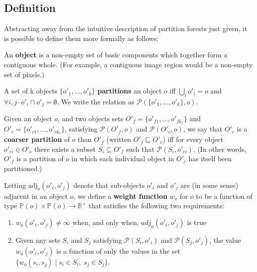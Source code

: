 \subsection{Definition}
\label{sec:ipfs-definition}

Abstracting away from the intuitive description of partition forests just given, it is possible to define them more formally as follows:

\begin{definition}
An \textbf{object} is a non-empty set of basic components which together form a contiguous whole. (For example, a contiguous image region would be a non-empty set of pixels.)
\end{definition}

\begin{definition}
A set of k objects $\{o'_1,\ldots,o'_k\}$ \textbf{partitions} an object $o$ iff $\bigcup_i o'_i = o$ and $\forall i,j \cdot o'_i \cap o'_j = \emptyset$. We write the relation as $\mathcal{P}(\{o'_1,\ldots,o'_k\}, o)$.
\end{definition}

\begin{definition}
Given an object $o$, and two objects sets $O'_f = \{o'_{f1},\ldots,o'_{fk_f}\}$ and $O'_c = \{o'_{c1},\ldots,o'_{ck_c}\}$, satisfying $\mathcal{P}(O'_f,o)$ and $\mathcal{P}(O'_c,o)$, we say that $O'_c$ is a \textbf{coarser partition} of $o$ than $O'_f$ (written $O'_f \sqsubseteq O'_c$) iff for every object $o'_{ci} \in O'_c$ there exists a subset $S_i \subseteq O'_f$ such that $\mathcal{P}(S_i,o'_{ci})$. (In other words, $O'_f$ is a partition of $o$ in which each individual object in $O'_c$ has itself been partitioned.)
\end{definition}

\begin{definition}
Letting $\mbox{adj}_o(o'_i, o'_j)$ denote that sub-objects $o'_i$ and $o'_j$ are (in some sense) adjacent in an object $o$, we define a \textbf{weight function} $w_o$ for $o$ to be a function of type $\mathbb{P}(o) \times \mathbb{P}(o) \to \mathbb{R}^+$ that satisfies the following two requirements:
%
\begin{enumerate}

\item $w_o(o'_i, o'_j) \ne \infty$ when, and only when, $adj_o(o'_i, o'_j)$ is true

\item Given any sets $S_i$ and $S_j$ satisfying $\mathcal{P}(S_i,o'_i)$ and $\mathcal{P}(S_j,o'_j)$, the value $w_o(o'_i, o'_j)$ is a function of only the values in the set $\{w_o(s_i, s_j) \; | \; s_i \in S_i, \; s_j \in S_j\}$.

\end{enumerate}

\end{definition}


